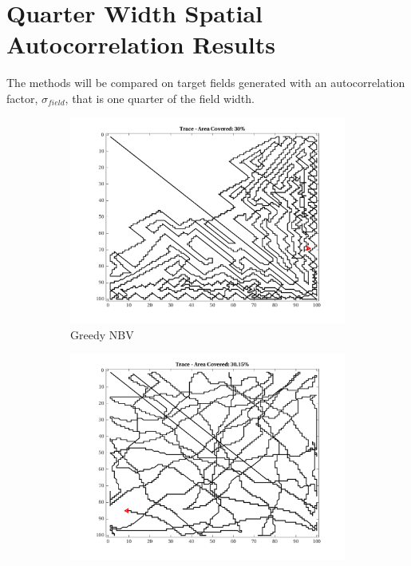 \FloatBarrier
\clearpage

\section{Quarter Width Spatial Autocorrelation Results}
The methods will be compared on target fields generated with an autocorrelation factor, $\sigma_{field}$, that is one quarter of the field width.

\begin{figure}[htb!]
    \centering
    \begin{subfigure}[t]{0.25\textwidth}
        \centering
        \includegraphics[width=\linewidth]{figures/path_greedy_30p_100x100_sf_25_seed_1.png}
        \captionsetup{skip=0.20\baselineskip,size=footnotesize}
        \caption{Greedy NBV}
    \end{subfigure}%
    \begin{subfigure}[t]{0.25\textwidth}
        \centering
        \includegraphics[width=\linewidth]{figures/path_mc_30p_100x100_sf_25_seed_1.png}

\end{subfigure}
\end{figure}
